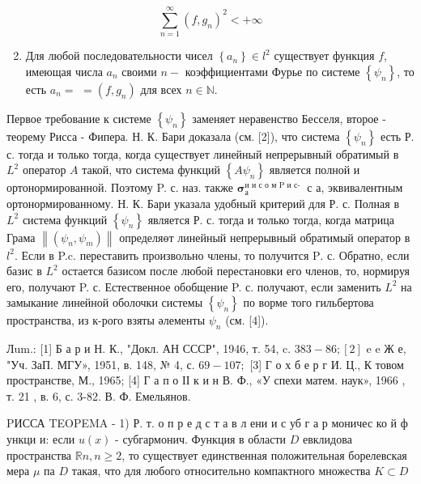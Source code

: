 \documentclass[10pt]{article}
\begin{document}
\[

\sum_{n=1}^{\infty}\left(f, g_{n}\right)^{2}<+\infty

\]



\begin{enumerate}

  \setcounter{enumi}{1}

  \item Для любой последовательности чисел $\left\{a_{n}\right\} \in l^{2}$ существует функция $f$, имеющая числа $a_{n}$ своими $n-$ коэффициентами Фурье по системе $\left\{\psi_{n}\right\}$, то есть $a_{n}=$ $=\left(f, g_{n}\right)$ для всех $n \in \mathbb{N}$.

\end{enumerate}



Первое требование к системе $\left\{\psi_{n}\right\}$ заменяет неравенство Бесселя, второе - теорему Рисса - Фипера. Н. К. Бари доказала (см. [2]), что система $\left\{\psi_{n}\right\}$ есть Р. с. тогда и только тогда, когда существует линейный непрерывный обратимый в $L^{2}$ оператор $A$ такой, что система функций $\left\{A \psi_{n}\right\}$ является полной и ортонормированной. Поэтому P. с. наз. также $\boldsymbol{\sigma}_{\text {а }}^{\text {и и с о м } \mathrm{P} \text { и с- }}$ с а, эквивалентным ортонормированному. Н. К. Бари указала удобный критерий для Р. с. Полная в $L^{2}$ система функций $\left\{\psi_{n}\right\}$ является Р. с. тогда и только тогда, когда матрица Грама $\left\|\left(\psi_{n}, \psi_{m}\right)\right\|$ определяөт линейный непрерывный обратимый оператор в $l^{2}$. Если в P.c. переставить произвольно члены, то получится $\mathrm{P}$. с. Обратно, если базис в $L^{2}$ остается базисом после любой перестановки его членов, то, нормируя его, получают P. с. Естественное обобщение P. с. получают, если заменить $L^{2}$ на замыкание линейной оболочки системы $\left\{\psi_{n}\right\}$ по ворме того гильбертова пространства, из к-рого взяты әлементы $\psi_{n}$ (см. [4]).



Лum.: [1] Б а р и Н. К., "Докл. АН СССР", 1946, т. 54, c. $383-86 ;[2]$ e e Ж е, "Уч. ЗаП. МГУ», 1951, в. 148, № 4, с. $69-107 ;$ [3] Г о х б е р г И. Ц., К товом пространстве, М., 1965; [4] Г а п о ІІ к и н В. Ф., «У спехи матем. наук», 1966 , т. 21 , в. 6, с. 3-82. В. Ф. Емельянов.



PИССА TEOPEMA - 1) Р. т. о п р е д с т а в л ени и с уб г а р моничес ко й ф ункци и: если $u(x)$ - субгармонич. Функция в области $D$ евклидова пространства $\mathbb{R} n, n \geqslant 2$, то существует единственная положительная борелевская мера $\mu$ па $D$ такая, что для любого относительно компактного множества $K \subset D$
\end{document}

